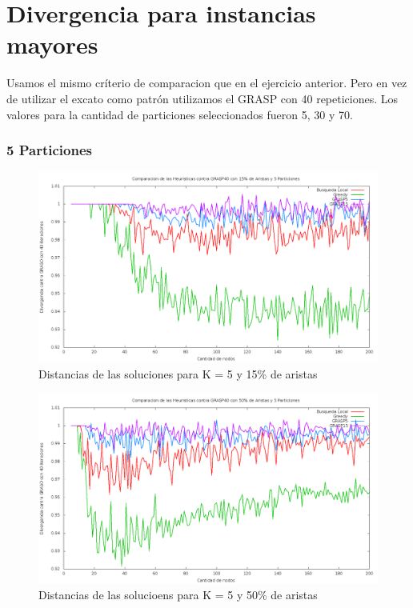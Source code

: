 \section{Divergencia para instancias mayores}

Usamos el mismo cr\'iterio de comparacion que en el ejercicio anterior. Pero en vez de utilizar el excato como patr\'on utilizamos el GRASP con 40 repeticiones. Los valores para la cantidad de particiones seleccionados fueron 5, 30 y 70.

\subsubsection{5 Particiones}

\begin{figure}[H]
\begin{center}
\includegraphics[scale=0.3]{finales/muchosComparacionesCon5Particiones15Aristas.png}
\caption{Distancias de las soluciones para K = 5 y 15\% de aristas}
\end{center}
\end{figure}

\begin{figure}[H]
\begin{center}
\includegraphics[scale=0.3]{finales/muchosComparacionesCon5Particiones50Aristas.png}
\caption{Distancias de las solucioens para K = 5 y 50\% de aristas}
\end{center}
\end{figure}

